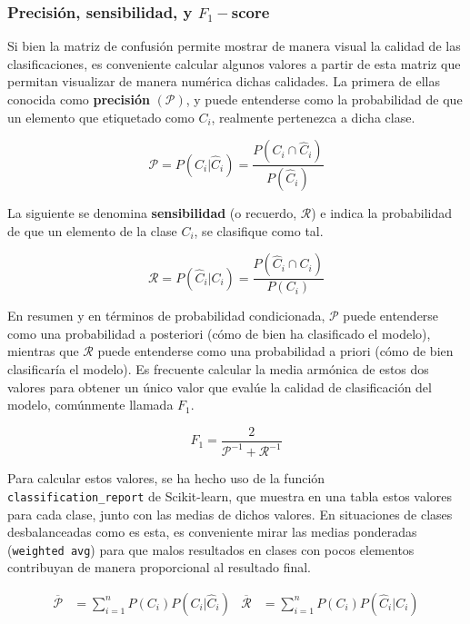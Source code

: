 			\subsubsection{Precisión, sensibilidad, y $F_1-$score}\label{subsub:f1}
				
				Si bien la matriz de confusión permite mostrar de manera visual la calidad de las clasificaciones, es conveniente calcular algunos valores \cite{metricas_matriz} a partir de esta matriz que permitan visualizar de manera numérica dichas calidades. La primera de ellas conocida como \textbf{precisión} $(\mathcal{P})$, y puede entenderse como la probabilidad de que un elemento que etiquetado como $C_i$, realmente pertenezca a dicha clase. 
				
				$$
				\mathcal{P} = P(C_i | \hat{C}_i) = \frac{P(C_i \cap \hat{C}_i)}{P(\hat{C}_i)}
				$$
				
				La siguiente se denomina \textbf{sensibilidad} (o recuerdo, $\mathcal{R}$) e indica la probabilidad de que un elemento de la clase $C_i$, se clasifique como tal. 
				
				$$
				\mathcal{R} = P(\hat{C}_i | C_i) = \frac{P(\hat{C}_i \cap C_i)}{P(C_i)}
				$$
				
				En resumen y en términos de probabilidad condicionada, $\mathcal{P}$ puede entenderse como una probabilidad a posteriori (cómo de bien ha clasificado el modelo), mientras que $\mathcal{R}$ puede entenderse como una probabilidad a priori (cómo de bien clasificaría el modelo). Es frecuente calcular la media armónica de estos dos valores para obtener un único valor que evalúe la calidad de clasificación del modelo, comúnmente llamada $F_1$. 
				
				$$
				F_1 = \frac{2}{\mathcal{P}^{-1} + \mathcal{R}^{-1}}
				$$
				
				Para calcular estos valores, se ha hecho uso de la función \texttt{classification\_report} de Scikit-learn, que muestra en una tabla estos valores para cada clase, junto con las medias de dichos valores. En situaciones de clases desbalanceadas como es esta, es conveniente mirar las medias ponderadas (\texttt{weighted avg}) para que malos resultados en clases con pocos elementos contribuyan de manera proporcional al resultado final. 
				
				\begin{align*}
					\overline{\mathcal{P}} &= \sum_{i=1}^n P(C_i)P(C_i | \hat{C}_i) &
					\overline{\mathcal{R}} &= \sum_{i=1}^n P(C_i)P(\hat{C}_i | C_i)
				\end{align*}
				
